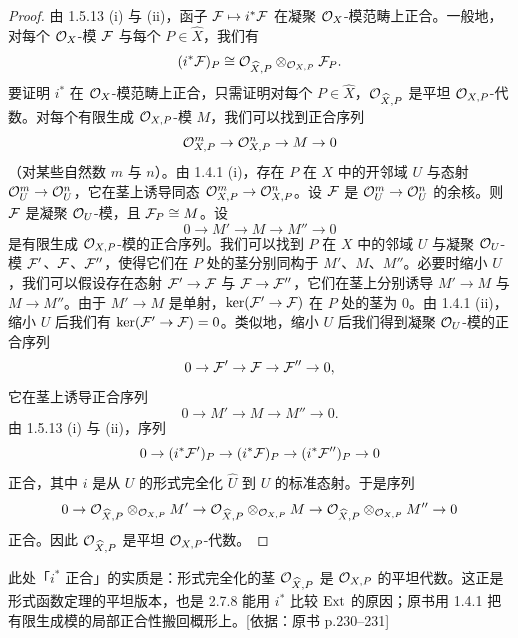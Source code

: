 \begin{proof}
由 1.5.13 (i) 与 (ii)，函子 $\mathcal{F}\mapsto i^*\mathcal{F}$ 在凝聚 $\mathcal{O}_X$-模范畴上正合。一般地，对每个 $\mathcal{O}_X$-模 $\mathcal{F}$ 与每个 $P\in\widehat{X}$，我们有
\begin{equation*}
(i^*\mathcal{F})_P\cong\mathcal{O}_{\widehat{X},P}\otimes_{\mathcal{O}_{X,P}}\mathcal{F}_P.
\end{equation*}
要证明 $i^*$ 在 $\mathcal{O}_X$-模范畴上正合，只需证明对每个 $P\in\widehat{X}$，$\mathcal{O}_{\widehat{X},P}$ 是平坦 $\mathcal{O}_{X,P}$-代数。对每个有限生成 $\mathcal{O}_{X,P}$-模 $M$，我们可以找到正合序列
\begin{equation*}
\mathcal{O}_{X,P}^m\to\mathcal{O}_{X,P}^n\to M\to 0
\end{equation*}
（对某些自然数 $m$ 与 $n$）。由 1.4.1 (i)，存在 $P$ 在 $X$ 中的开邻域 $U$ 与态射 $\mathcal{O}_U^m\to\mathcal{O}_U^n$，它在茎上诱导同态 $\mathcal{O}_{X,P}^m\to\mathcal{O}_{X,P}^n$。设 $\mathcal{F}$ 是 $\mathcal{O}_U^m\to\mathcal{O}_U^n$ 的余核。则 $\mathcal{F}$ 是凝聚 $\mathcal{O}_U$-模，且 $\mathcal{F}_P\cong M$。设
\begin{equation*}
0\to M'\to M\to M''\to 0
\end{equation*}
是有限生成 $\mathcal{O}_{X,P}$-模的正合序列。我们可以找到 $P$ 在 $X$ 中的邻域 $U$ 与凝聚 $\mathcal{O}_U$-模 $\mathcal{F}'$、$\mathcal{F}$、$\mathcal{F}''$，使得它们在 $P$ 处的茎分别同构于 $M'$、$M$、$M''$。必要时缩小 $U$，我们可以假设存在态射 $\mathcal{F}'\to\mathcal{F}$ 与 $\mathcal{F}\to\mathcal{F}''$，它们在茎上分别诱导 $M'\to M$ 与 $M\to M''$。由于 $M'\to M$ 是单射，$\ker(\mathcal{F}'\to\mathcal{F})$ 在 $P$ 处的茎为 $0$。由 1.4.1 (ii)，缩小 $U$ 后我们有 $\ker(\mathcal{F}'\to\mathcal{F})=0$。类似地，缩小 $U$ 后我们得到凝聚 $\mathcal{O}_U$-模的正合序列
\begin{equation*}
0\to\mathcal{F}'\to\mathcal{F}\to\mathcal{F}''\to 0,
\end{equation*}
它在茎上诱导正合序列
\begin{equation*}
0\to M'\to M\to M''\to 0.
\end{equation*}
由 1.5.13 (i) 与 (ii)，序列
\begin{equation*}
0\to(i^*\mathcal{F}')_P\to(i^*\mathcal{F})_P\to(i^*\mathcal{F}'')_P\to 0
\end{equation*}
正合，其中 $i$ 是从 $U$ 的形式完全化 $\widehat{U}$ 到 $U$ 的标准态射。于是序列
\begin{equation*}
0\to\mathcal{O}_{\widehat{X},P}\otimes_{\mathcal{O}_{X,P}}M'\to\mathcal{O}_{\widehat{X},P}\otimes_{\mathcal{O}_{X,P}}M\to\mathcal{O}_{\widehat{X},P}\otimes_{\mathcal{O}_{X,P}}M''\to 0
\end{equation*}
正合。因此 $\mathcal{O}_{\widehat{X},P}$ 是平坦 $\mathcal{O}_{X,P}$-代数。
\end{proof}

\begin{tnote}
此处「$i^*$ 正合」的实质是：形式完全化的茎 $\mathcal{O}_{\widehat{X},P}$ 是 $\mathcal{O}_{X,P}$ 的平坦代数。这正是形式函数定理的平坦版本，也是 2.7.8 能用 $i^*$ 比较 $\operatorname{Ext}$ 的原因；原书用 1.4.1 把有限生成模的局部正合性搬回概形上。[依据：原书 p.230–231]
\end{tnote}

